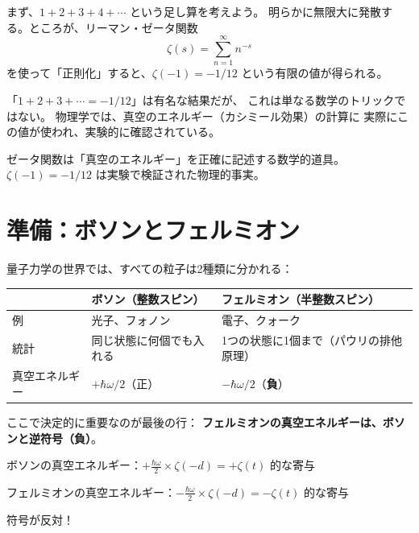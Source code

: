 \documentclass[11pt,a4paper]{article}
\begin{document}
まず、$1 + 2 + 3 + 4 + \cdots$ という足し算を考えよう。
明らかに無限大に発散する。ところが、リーマン・ゼータ関数
\begin{equation}
  \zeta(s) = \sum_{n=1}^{\infty} n^{-s}
\end{equation}
を使って「正則化」すると、$\zeta(-1) = -1/12$ という有限の値が得られる。

「$1 + 2 + 3 + \cdots = -1/12$」は有名な結果だが、
これは単なる数学のトリックではない。
物理学では、真空のエネルギー（カシミール効果）の計算に
実際にこの値が使われ、実験的に確認されている。

\begin{tcolorbox}[colback=green!5,colframe=green!50!black,title=ポイント]
ゼータ関数は「真空のエネルギー」を正確に記述する数学的道具。
$\zeta(-1) = -1/12$ は実験で検証された物理的事実。
\end{tcolorbox}


\section{準備：ボソンとフェルミオン}

量子力学の世界では、すべての粒子は2種類に分かれる：

\begin{center}
\begin{tabular}{lll}
\toprule
& ボソン（整数スピン） & フェルミオン（半整数スピン） \\
\midrule
例 & 光子、フォノン & 電子、クォーク \\
統計 & 同じ状態に何個でも入れる & 1つの状態に1個まで（パウリの排他原理） \\
真空エネルギー & $+\hbar\omega/2$（正） & $-\hbar\omega/2$（\textbf{負}） \\
\bottomrule
\end{tabular}
\end{center}

ここで決定的に重要なのが最後の行：
\textbf{フェルミオンの真空エネルギーは、ボソンと逆符号（負）}。

\begin{tcolorbox}[colback=red!5,colframe=red!50!black,title=核心]
ボソンの真空エネルギー：$+\frac{\hbar\omega}{2} \times \zeta(-d) = +\zeta(t)$ 的な寄与

フェルミオンの真空エネルギー：$-\frac{\hbar\omega}{2} \times \zeta(-d) = -\zeta(t)$ 的な寄与

符号が反対！
\end{tcolorbox}
\end{document}
